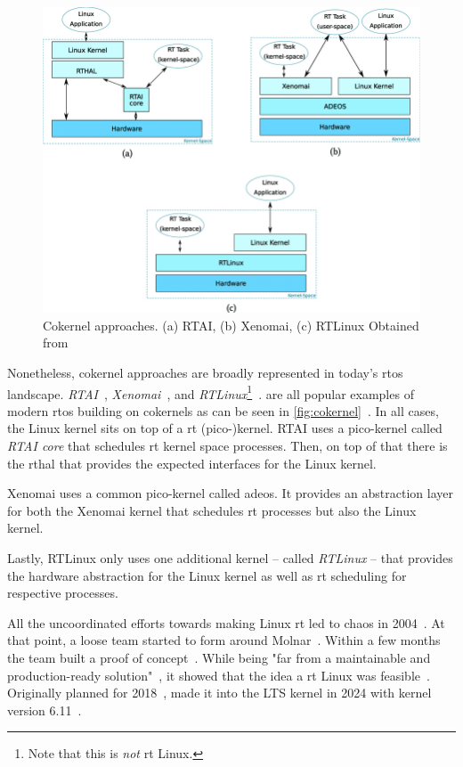 \documentclass[10pt,twocolumn,a4paper]{article}
\begin{document}
\begin{figure}[ht]
  \centering
  \includegraphics[scale=.50, clip]{assets/cokernel.png}
  \caption{Cokernel approaches. (a) RTAI, (b) Xenomai, (c) RTLinux Obtained from~\cite{reghenzani_realtime_2019} \label{fig:cokernel}}
\end{figure}
Nonetheless, cokernel approaches are broadly represented in today's \acrshort{rtos} landscape.
\emph{RTAI}~\cite{rtai-docs}, \emph{Xenomai}~\cite{xenomai-docs}, and \emph{RTLinux}\footnote{Note that this is \emph{not} \acrlong{rt} Linux.}~\cite{rtlinux}. are all popular examples of modern \acrshort{rtos} building on cokernels as can be seen in \autoref{fig:cokernel}~\cite{reghenzani_realtime_2019}.
In all cases, the Linux kernel sits on top of a \acrshort{rt} (pico-)kernel.
RTAI uses a pico-kernel called \emph{RTAI core} that schedules \acrshort{rt} kernel space processes.
Then, on top of that there is the \acrfull{rthal} that provides the expected interfaces for the Linux kernel.

Xenomai uses a common pico-kernel called \acrfull{adeos}.
It provides an abstraction layer for both the Xenomai kernel that schedules \acrshort{rt} processes but also the Linux kernel.

Lastly, RTLinux only uses one additional kernel -- called \emph{RTLinux} -- that provides the hardware abstraction for the Linux kernel as well as \acrshort{rt} scheduling for respective processes.
\newline

\noindent All the uncoordinated efforts towards making Linux \acrshort{rt} led to chaos in 2004~\cite{perlow_trenches_2021}.
At that point, a loose team started to form around Molnar~\cite{perlow_trenches_2021}.
Within a few months the team built a proof of concept~\cite{perlow_trenches_2021}.
While being "far from a maintainable and production-ready solution"~\cite[Gleixner]{perlow_trenches_2021}, it showed that the idea a \acrshort{rt} Linux was feasible~\cite{perlow_trenches_2021}.
Originally planned for 2018~\cite{lf:history},  made it into the LTS kernel in 2024 with kernel version 6.11~\cite{lf:versions}.
\end{document}
